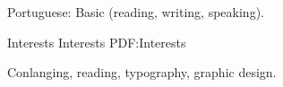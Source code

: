 \documentclass[letterpaper,MMMyyyy,nonstopmode]{simpleresumecv}
\newcommand{\Code}[1]{\mbox{\textbf{#1}}}
\newcommand{\CodeCommand}[1]{\mbox{\textbf{\textbackslash{#1}}}}
\begin{document}
\begin{Body}
\Gap
\BulletItem
Portuguese: Basic (reading, writing, speaking).


\Section
{Interests}
{Interests}
{PDF:Interests}

\Entry
Conlanging,
reading,
typography,
graphic design.











\end{Body}
\end{document}
